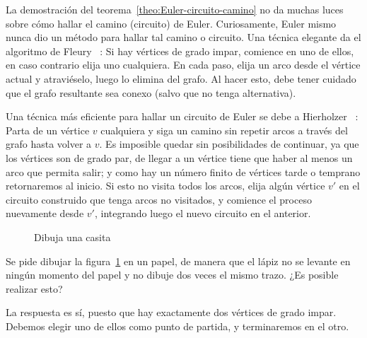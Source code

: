   La demostración del teorema~\ref{theo:Euler-circuito-camino}
  no da muchas luces sobre cómo hallar el camino
  (circuito) de Euler.
  Curiosamente,
  Euler mismo nunca dio un método para hallar tal camino o circuito.
  Una técnica elegante da el algoritmo de Fleury~%
    \cite{fleury83:_deux_probl_geomet_situac}:%
  Si hay vértices de grado impar,
  comience en uno de ellos,
  en caso contrario elija uno cualquiera.
  En cada paso,
  elija un arco desde el vértice actual y atraviéselo,
  luego lo elimina del grafo.
  Al hacer esto,
  debe tener cuidado que el grafo resultante sea conexo
  (salvo que no tenga alternativa).

  Una técnica más eficiente para hallar un circuito de Euler
  se debe a Hierholzer~%
    \cite{hierholzer73:_ueber_moegl_linien}:%
  Parta de un vértice \(v\) cualquiera
  y siga un camino sin repetir arcos a través del grafo
  hasta volver a \(v\).
  Es imposible quedar sin posibilidades de continuar,
  ya que los vértices son de grado par,
  de llegar a un vértice
  tiene que haber al menos un arco que permita salir;
  y como hay un número finito de vértices
  tarde o temprano retornaremos al inicio.
  Si esto no visita todos los arcos,
  elija algún vértice \(v'\) en el circuito construido
  que tenga arcos no visitados,
  y comience el proceso nuevamente desde \(v'\),
  integrando luego el nuevo circuito en el anterior.


  \begin{example}
    \begin{figure}[htbp]
     \centering
      \caption{Dibuja una casita}
      \label{fig:casita}
   \end{figure}
    Se pide dibujar la figura~\ref{fig:casita} en un papel,
    de manera que el lápiz no se levante en ningún momento del papel
    y no dibuje dos veces el mismo trazo.
    ¿Es posible realizar esto?

    La respuesta es sí,
    puesto que hay exactamente dos vértices de grado impar.
    Debemos elegir uno de ellos como punto de partida,
    y terminaremos en el otro.
  \end{example}

